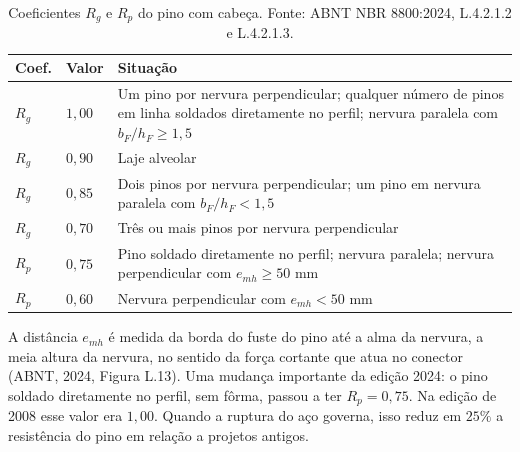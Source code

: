 \documentclass[11pt,a4paper]{article}
\begin{document}
\begin{table}[!htbp]
  \centering
  \caption{Coeficientes $R_g$ e $R_p$ do pino com cabeça. Fonte: ABNT NBR 8800:2024, L.4.2.1.2 e L.4.2.1.3.}
  \label{tab:rg-rp}
  \small
  \begin{tabularx}{\linewidth}{llX}
    \toprule
    \textbf{Coef.} & \textbf{Valor} & \textbf{Situação} \\
    \midrule
    $R_g$ & $1{,}00$ & Um pino por nervura perpendicular; qualquer número de pinos em linha soldados diretamente no perfil; nervura paralela com $b_F/h_F \ge 1{,}5$ \\
    $R_g$ & $0{,}90$ & Laje alveolar \\
    $R_g$ & $0{,}85$ & Dois pinos por nervura perpendicular; um pino em nervura paralela com $b_F/h_F < 1{,}5$ \\
    $R_g$ & $0{,}70$ & Três ou mais pinos por nervura perpendicular \\
    \midrule
    $R_p$ & $0{,}75$ & Pino soldado diretamente no perfil; nervura paralela; nervura perpendicular com $e_{mh} \ge 50\text{ mm}$ \\
    $R_p$ & $0{,}60$ & Nervura perpendicular com $e_{mh} < 50\text{ mm}$ \\
    \bottomrule
  \end{tabularx}
\end{table}

A distância $e_{mh}$ é medida da borda do fuste do pino até a alma da nervura, a meia altura da nervura, no sentido da força cortante que atua no conector (ABNT, 2024, Figura L.13). Uma mudança importante da edição 2024: o pino soldado diretamente no perfil, sem fôrma, passou a ter $R_p = 0{,}75$. Na edição de 2008 esse valor era $1{,}00$. Quando a ruptura do aço governa, isso reduz em $25\%$ a resistência do pino em relação a projetos antigos.
\end{document}
